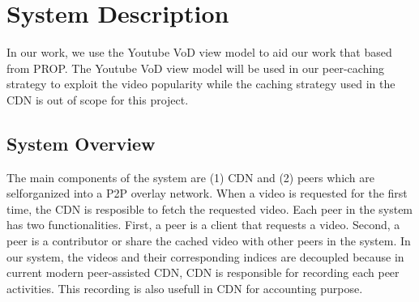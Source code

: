\documentclass[10pt,final,journal,a4paper]{IEEEtran}
\begin{document}



\section{System Description}\label{systemdescription}
In our work, we use the Youtube VoD view model to aid our work that based from PROP. 
The Youtube VoD view model will be used in our peer-caching strategy to exploit the video popularity while the caching strategy used in the CDN is out of scope for this project. 

\subsection{System Overview}\label{systemoverview}
The main components of the system are (1) CDN and (2) peers which are selforganized into a P2P overlay network.
When a video is requested for the first time, the CDN is resposible to fetch the requested video.
Each peer in the system has two functionalities.
First, a peer is a client that requests a video. 
Second, a peer is a contributor or share the cached video with other peers in the system. 
In our system, the videos and their corresponding indices are decoupled because in current modern peer-assisted CDN, CDN is responsible for recording each peer activities.  
This recording is also usefull in CDN for accounting purpose.
\end{document}
